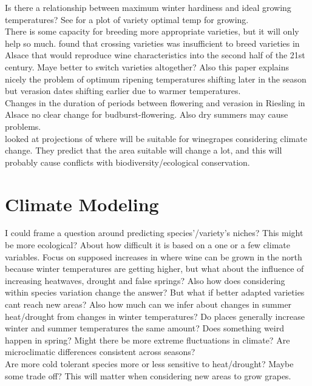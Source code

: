 \documentclass[11pt,letter]{article}
\begin{document}
Is there a relationship between maximum winter hardiness and ideal growing temperatures? See \cite{Ashenfelter2016} for a plot of variety optimal temp for growing. \\

There is some capacity for breeding more appropriate varieties, but it will only help so much. \cite{Duchene2010} found that crossing varieties was insufficient to breed varieties in Alsace that would reproduce wine characteristics into the second half of the 21st century. Maye better to switch varieties altogether? Also this paper explains nicely the problem of optimum ripening temperatures shifting later in the season but verasion dates shifting earlier due to warmer temperatures. \\ 

Changes in the duration of periods between flowering and verasion in Riesling in Alsace \citep{Duchene2005} no clear change for budburst-flowering. Also dry summers may cause problems. \\

\cite{Hannah2013} looked at projections of where will be suitable for winegrapes considering climate change. They predict that the area suitable will change a lot, and this will probably cause conflicts with biodiversity/ecological conservation. \\

\section{Climate Modeling}

I could frame a question around predicting species’/variety's niches? This might be more ecological? About how difficult it is based on a one or a few climate variables. Focus on supposed increases in where wine can be grown in the north because winter temperatures are getting higher, but what about the influence of increasing heatwaves, drought and false springs? Also how does considering within species variation change the answer? But what if better adapted varieties cant reach new areas? Also how much can we infer about changes in summer heat/drought from changes in winter temperatures? Do places generally increase winter and summer temperatures the same amount? Does something weird happen in spring? Might there be more extreme fluctuations in climate? Are microclimatic differences consistent across seasons? \\

Are more cold tolerant species more or less sensitive to heat/drought? Maybe some trade off? This will matter when considering new areas to grow grapes. \\
\end{document}
